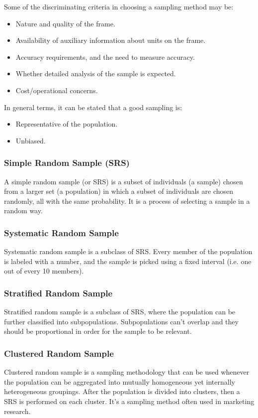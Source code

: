 \documentclass{article}
\begin{document}
Some of the discriminating criteria in choosing a sampling method may be:
\begin{itemize}
    \item Nature and quality of the frame.
    \item Availability of auxiliary information about units on the frame.
    \item Accuracy requirements, and the need to measure accuracy.
    \item Whether detailed analysis of the sample is expected.
    \item Cost/operational concerns.
\end{itemize}

In general terms, it can be stated that a good sampling is:
\begin{itemize}
    \item Representative of the population.
    \item Unbiased. 
\end{itemize}
 
\subsubsection{Simple Random Sample (SRS)}
A simple random sample (or SRS) is a subset of individuals (a sample) chosen from a larger set (a population) in which a subset of individuals are chosen randomly, all with the same probability. It is a process of selecting a sample in a random way.

\subsubsection{Systematic Random Sample}
Systematic random sample is a subclass of SRS. Every member of the population is labeled with a number, and the sample is picked using a fixed interval (i.e. one out of every 10 members).

\subsubsection{Stratified Random Sample}
Stratified random sample is a subclass of SRS, where the population can be further classified into subpopulations. Subpopulations can’t overlap and they should be proportional in order for the sample to be relevant. 

\subsubsection{Clustered Random Sample}
Clustered random sample is a sampling methodology that can be used whenever the population can be aggregated into mutually homogeneous yet internally heterogeneous groupings. 
After the population is divided into clusters, then a SRS is performed on each cluster.
It’s a sampling method often used in marketing research.
\end{document}
